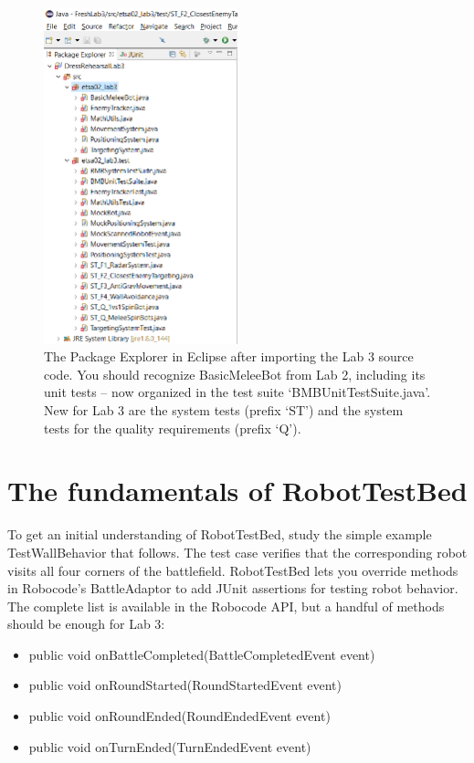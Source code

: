 \documentclass{scrreprt}
\begin{document}
\begin{figure}
\centering
\includegraphics[width=0.5\textwidth]{figures/packageExplorerAfterImport.png}
\caption{The Package Explorer in Eclipse after importing the Lab 3 source code. You should recognize BasicMeleeBot from Lab 2, including its unit tests -- now organized in the test suite `BMBUnitTestSuite.java'. New for Lab 3 are the system tests (prefix `ST') and the system tests for the quality requirements (prefix `Q').}
\label{fig:afterImport}
\end{figure}

\section{The fundamentals of RobotTestBed}

To get an initial understanding of RobotTestBed, study the simple example TestWallBehavior that follows. The test case verifies that the corresponding robot visits all four corners of the battlefield. RobotTestBed lets you override methods in Robocode's BattleAdaptor to add JUnit assertions for testing robot behavior. The complete list is available in the Robocode API, but a handful of methods should be enough for Lab 3:
\begin{itemize}
\item public void onBattleCompleted(BattleCompletedEvent event)
\item public void onRoundStarted(RoundStartedEvent event)
\item public void onRoundEnded(RoundEndedEvent event)
\item public void onTurnEnded(TurnEndedEvent event)
\end{itemize}
\end{document}
